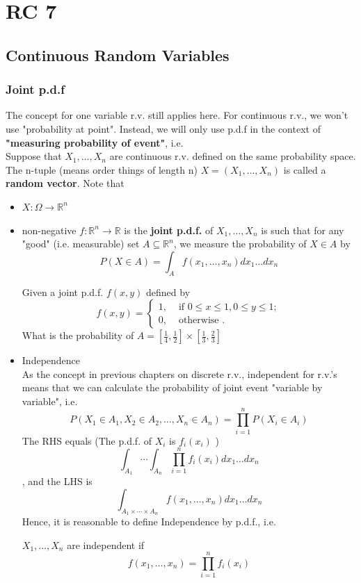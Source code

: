 \chapter{RC 7}

\section{Continuous Random Variables}

\subsection*{Joint p.d.f}
The concept for one variable r.v. still applies here. For continuous r.v., we won't use "probability at point". 
Instead, we will only use p.d.f in the context of \textbf{"measuring probability of event"}, i.e. \\
\cite{Und_Chatterjee}
Suppose that \(X_1, \dots, X_n\) are continuous r.v. defined on the same probability space. The n-tuple (means order things of length n) \(X = (X_1, \dots, X_n)\) is called a \textbf{random vector}. Note that 
\begin{itemize}
    \item \(X : \Omega \to  \mathbb{R}^n\)
    \item non-negative \(f: \mathbb{R}^n \to  \mathbb{R}\)  is the \textbf{joint p.d.f.} of \(X_1, \dots,X_n\) is such that for any "good" (i.e. measurable) set \(A \subseteq \mathbb{R}^n\), we measure the probability of \(X\in A\) by   
\[
    P(X \in A) = \int_A f(x_1, \dots, x_n)dx_1 \dots dx_n
\]

\begin{exercise}
    Given a joint p.d.f. \(f(x,y)\) defined by 
    \[
        f(x,y) = \begin{cases}
            1, &\text{ if } 0\leq x\leq 1, 0 \leq y \leq  1 ;\\
            0, &\text{ otherwise } .
        \end{cases}
    \]
    What is the probability of \(A = [\frac{1}{4}, \frac{1}{2}]\times [\frac{1}{3},\frac{2}{3}]\) 
\end{exercise}
    \item Independence \\
    As the concept in previous chapters on discrete r.v., independent for r.v.'s means that we can calculate the 
    probability of joint event "variable by variable", i.e. 
    \[
        P(X_{1} \in A_1, X_2 \in A_2 , \dots , X_n \in A_n ) = \prod_{i = 1}^n P(X_i \in A_{i} )
    \]
    The RHS equals (The p.d.f. of \(X_i\) is \(f_i(x_i)\)  )
    \[
      \int_{A_1} \cdots \int_{A_n} \prod_{i = 1}^n f_i(x_i) dx_1 \dots dx_n    
    \],
    and the LHS is 
    \[
        \int_{A_1 \times \cdots \times A_n  } f(x_1, \dots, x_n) dx_1 \dots dx_n    
    \]
    Hence, it is reasonable to define Independence by p.d.f., i.e. 
    \begin{remark}
       \(X_{1},\dots, X_n \)  are independent if 
       \[
            f(x_1, \dots, x_n) = \prod_{i=1}^n f_i(x_i)
       \]
    \end{remark} 
\end{itemize}      

